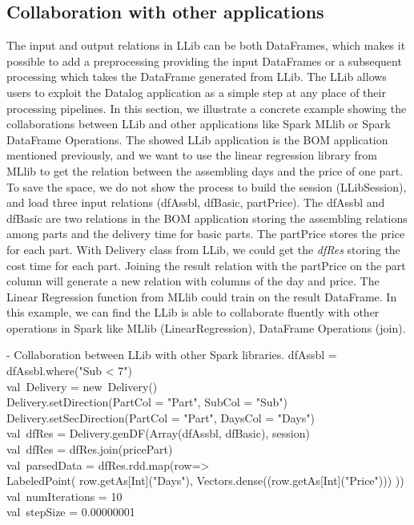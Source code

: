 \subsection{Collaboration with other applications}
The input and output relations in LLib can be both DataFrames, which makes it possible to add a preprocessing  providing the input DataFrames  or  a subsequent processing which takes the DataFrame generated from LLib. The LLib allows users to exploit the Datalog application as a simple step at any place of their  processing pipelines. In this section, we illustrate a concrete example showing the collaborations between LLib and other applications like Spark MLlib or Spark DataFrame Operations. The showed LLib application is the BOM application mentioned previously, and we want to use the linear regression library from MLlib to get the relation between the assembling days and the price of one part. To save the space, we do not show the process to build the session (LLibSession), and load three input relations (dfAssbl, dfBasic, partPrice).  The dfAssbl and dfBasic are two relations in the BOM application storing the assembling relations among parts and the delivery time for basic parts. The partPrice stores the price for each part. With Delivery class from LLib, we could get the \textit{dfRes} storing the cost time for each part. Joining the result relation with the partPrice on the part column will generate a new relation with columns of the day and price. The Linear Regression function from MLlib could train on the result DataFrame. In this example, we can find the  LLib is able to collaborate fluently with other operations in Spark like MLlib (LinearRegression), DataFrame Operations (join).

\vspace{0.5em}
 - Collaboration between LLib with other Spark libraries.
\bldl
dfAssbl = dfAssbl.where("Sub < 7")\\
val\ Delivery = new\ Delivery()\\
Delivery.setDirection(PartCol = "Part", SubCol = "Sub")\\
Delivery.setSecDirection(PartCol = "Part", DaysCol = "Days")\\
val\ dfRes = Delivery.genDF(Array(dfAssbl, dfBasic), session)\\
val\ dfRes = dfRes.join(pricePart)\\ 
val\ parsedData = dfRes.rdd.map(row=>\\ LabeledPoint(
row.getAs[Int]("Days"),
Vectors.dense((row.getAs[Int]("Price")))
))\\
val\ numIterations = 10 \\
val\ stepSize = 0.00000001 \\

